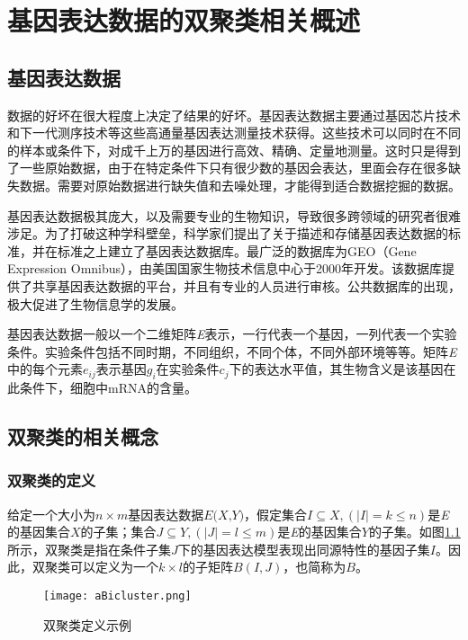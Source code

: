 \chapter{基因表达数据的双聚类相关概述}

\section{基因表达数据}
  数据的好坏在很大程度上决定了结果的好坏。基因表达数据主要通过基因芯片技术和下一代测序技术等这些高通量基因表达测量技术获得。这些技术可以同时在不同的样本或条件下，对成千上万的基因进行高效、精确、定量地测量。这时只是得到了一些原始数据，由于在特定条件下只有很少数的基因会表达，里面会存在很多缺失数据。需要对原始数据进行缺失值和去噪处理，才能得到适合数据挖掘的数据。

  基因表达数据极其庞大，以及需要专业的生物知识，导致很多跨领域的研究者很难涉足。为了打破这种学科壁垒，科学家们提出了关于描述和存储基因表达数据的标准，并在标准之上建立了基因表达数据库。最广泛的数据库为GEO（Gene Expression Omnibus），由美国国家生物技术信息中心于2000年开发。该数据库提供了共享基因表达数据的平台，并且有专业的人员进行审核。公共数据库的出现，极大促进了生物信息学的发展。

  基因表达数据一般以一个二维矩阵\textit{E}表示，一行代表一个基因，一列代表一个实验条件。实验条件包括不同时期，不同组织，不同个体，不同外部环境等等。矩阵\textit{E}中的每个元素$e_{ij} $表示基因$g_i$在实验条件$c_j$下的表达水平值，其生物含义是该基因在此条件下，细胞中mRNA的含量。

\section{双聚类的相关概念}

  \subsection{双聚类的定义}
  给定一个大小为$n\times m$基因表达数据$\textit{E(X,Y)}$，假定集合$I\subseteq X,(|I| = k \leq n)$是\textit{E}的基因集合$X$的子集；集合$J\subseteq Y,(|J| = l \leq m)$是\textit{E}的基因集合$Y$的子集。如图\ref{fig:define_bic}所示，双聚类是指在条件子集$J$下的基因表达模型表现出同源特性的基因子集$I$。因此，双聚类可以定义为一个$k \times l$的子矩阵$B(I, J)$，也简称为$B$。
  \begin{figure}[htbp]
      \centering
  \texttt{[image: aBicluster.png]}
  \caption{双聚类定义示例}
  \label{fig:define_bic}
  \end{figure}

